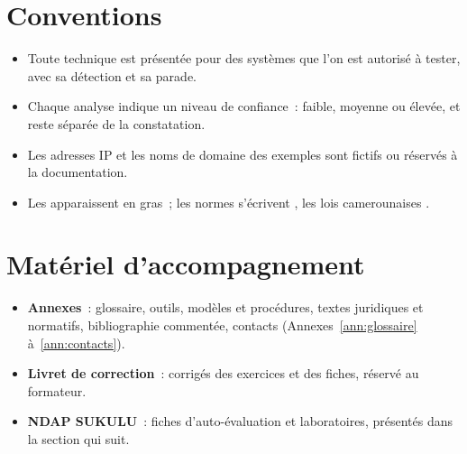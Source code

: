 \section*{Conventions}

\begin{itemize}
    \item Toute technique est présentée pour des systèmes que l'on est
          autorisé à tester, avec sa détection et sa parade.
    \item Chaque analyse indique un niveau de confiance~: faible, moyenne ou
          élevée, et reste séparée de la constatation.
    \item Les adresses IP et les noms de domaine des exemples sont fictifs ou
          réservés à la documentation.
    \item Les  apparaissent en gras~; les normes
          s'écrivent , les lois camerounaises
          .
\end{itemize}

\section*{Matériel d'accompagnement}

\begin{itemize}
    \item \textbf{Annexes}~: glossaire, outils, modèles et procédures,
          textes juridiques et normatifs, bibliographie commentée, contacts
          (Annexes~\ref{ann:glossaire} à~\ref{ann:contacts}).
    \item \textbf{Livret de correction}~: corrigés des exercices et des
          fiches, réservé au formateur.
    \item \textbf{NDAP SUKULU}~: fiches d'auto-évaluation et laboratoires,
          présentés dans la section qui suit.
\end{itemize}
